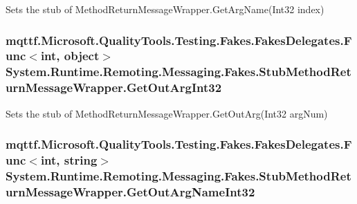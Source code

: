 Sets the stub of Method\-Return\-Message\-Wrapper.\-Get\-Arg\-Name(\-Int32 index)

\hypertarget{class_system_1_1_runtime_1_1_remoting_1_1_messaging_1_1_fakes_1_1_stub_method_return_message_wrapper_a2a4cc7820a92e61109e42ef704873e5e}{
\subsubsection[{Get\-Out\-Arg\-Int32}]{\setlength{\rightskip}{0pt plus 5cm}mqttf.\-Microsoft.\-Quality\-Tools.\-Testing.\-Fakes.\-Fakes\-Delegates.\-Func$<$int, object$>$ System.\-Runtime.\-Remoting.\-Messaging.\-Fakes.\-Stub\-Method\-Return\-Message\-Wrapper.\-Get\-Out\-Arg\-Int32}}\label{class_system_1_1_runtime_1_1_remoting_1_1_messaging_1_1_fakes_1_1_stub_method_return_message_wrapper_a2a4cc7820a92e61109e42ef704873e5e}


Sets the stub of Method\-Return\-Message\-Wrapper.\-Get\-Out\-Arg(\-Int32 arg\-Num)

\hypertarget{class_system_1_1_runtime_1_1_remoting_1_1_messaging_1_1_fakes_1_1_stub_method_return_message_wrapper_a884f9144edf26922058ff5d70acd3af2}{
\subsubsection[{Get\-Out\-Arg\-Name\-Int32}]{\setlength{\rightskip}{0pt plus 5cm}mqttf.\-Microsoft.\-Quality\-Tools.\-Testing.\-Fakes.\-Fakes\-Delegates.\-Func$<$int, string$>$ System.\-Runtime.\-Remoting.\-Messaging.\-Fakes.\-Stub\-Method\-Return\-Message\-Wrapper.\-Get\-Out\-Arg\-Name\-Int32}}\label{class_system_1_1_runtime_1_1_remoting_1_1_messaging_1_1_fakes_1_1_stub_method_return_message_wrapper_a884f9144edf26922058ff5d70acd3af2}


